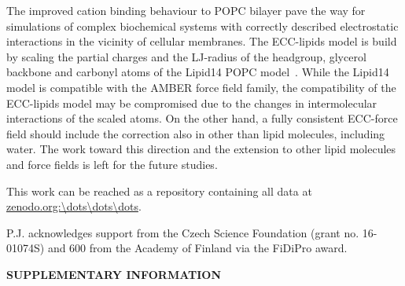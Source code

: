 \documentclass[aip,jcp,twocolumn]{revtex4}
\begin{document}
The improved cation binding behaviour to POPC bilayer pave the way for
simulations of complex biochemical systems with correctly described
electrostatic interactions in the vicinity of cellular membranes.
The ECC-lipids model is build by scaling the partial charges and
the LJ-radius of the headgroup, glycerol backbone and carbonyl atoms of
the Lipid14 POPC model~\cite{dickson14}. While the Lipid14 model
is compatible with the AMBER force field family, the compatibility of
the ECC-lipids model may be compromised due to the changes in intermolecular
interactions of the scaled atoms. On the other hand, a fully consistent
ECC-force field should include the correction also in other than lipid
molecules, including water. The work toward this direction and the extension
to other lipid molecules and force fields is left for the future studies.





This work can be reached as a repository containing all data at \url{zenodo.org:\dots\dots\dots}.



\begin{acknowledgments}
P.J. acknowledges support from the Czech Science Foundation (grant no. 16-01074S) 
and 600 from the Academy of Finland via the FiDiPro award.
\end{acknowledgments}


\newpage
\newpage
\appendix


\begin{center}
{\bf SUPPLEMENTARY INFORMATION}
\end{center}
\end{document}
